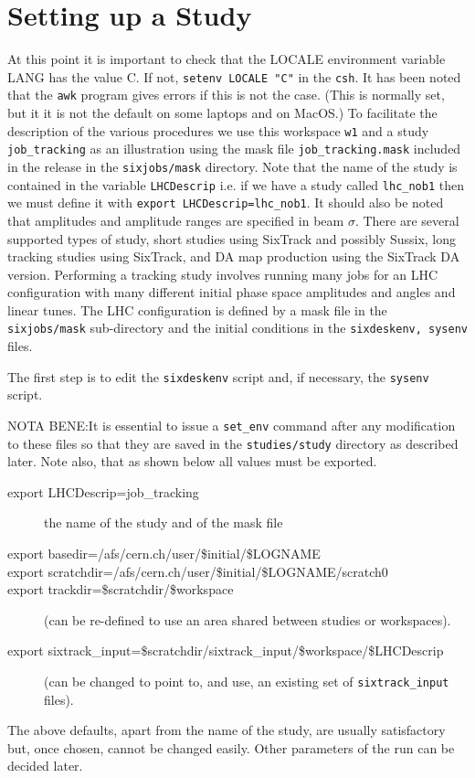 \documentclass{article}    %
\begin{document}
\section{Setting up a Study}
\label{sec:study}
At this point it is important to check that the LOCALE environment variable
LANG has the value C. If not, {\tt setenv LOCALE "C"} in the {\tt csh}.
It has been noted that the {\tt awk} program gives errors if this is not the
case. (This is normally set, but it it is not the default on some laptops
and on MacOS.)
To facilitate the description of the various procedures we use this workspace
{\tt w1} and a study {\tt job\_tracking} as an illustration using the mask
file {\tt job\_tracking.mask} included in the release in the {\tt sixjobs/mask}
directory. Note that the name of the
study is contained in the variable {\tt LHCDescrip} i.e. if we have a study
called {\tt lhc\_nob1} then we must define it 
with {\tt export LHCDescrip=lhc\_nob1}. It should also be noted that amplitudes
and amplitude ranges are specified in beam $\sigma$.
There are several supported types of study, short studies using SixTrack and possibly
Sussix, long tracking studies using SixTrack, and DA map production using the SixTrack DA version.
Performing a tracking study involves running many jobs for an LHC configuration with
many different initial phase space amplitudes and angles and linear tunes. The LHC configuration is
defined by a mask file in the {\tt sixjobs/mask} sub-directory and the initial
conditions in the {\tt sixdeskenv, sysenv} files.

The first step is to edit the {\tt sixdeskenv} script and, if necessary, 
the {\tt sysenv} script.

NOTA BENE:It is essential to issue
a {\tt set\_env} command after any modification to these files so that 
they are saved in the {\tt studies/study} directory as described later.
Note also, that as shown below all values must be exported.

\begin{description}
\item [export LHCDescrip=job\_tracking] the name of the study and of the mask file
\item [export basedir=/afs/cern.ch/user/\$initial/\$LOGNAME]
\item [export scratchdir=/afs/cern.ch/user/\$initial/\$LOGNAME/scratch0]
\item [export trackdir=\$scratchdir/\$workspace]
(can be re-defined to use an area shared between studies or workspaces).
\item [export sixtrack\_input=\$scratchdir/sixtrack\_input/\$workspace/\$LHCDescrip]
(can be changed to point to, and use, an existing set of {\tt sixtrack\_input} files).
\end{description}
The above defaults, apart from the name of the study,
are usually satisfactory but, once chosen,
cannot be changed easily. Other parameters of the run can be decided later.
\end{document}
